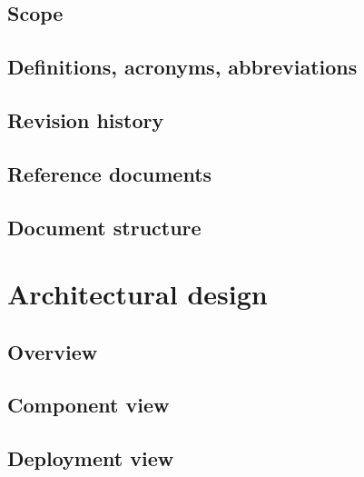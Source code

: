 \documentclass[10pt,english, openany]{book}
\begin{document}


\section{Scope}



\section{Definitions, acronyms, abbreviations}



\section{Revision history}



\section{Reference documents}



\section{Document structure}



\chapter{Architectural design}

\section{Overview}



\section{Component view}



\section{Deployment view}
\end{document}

